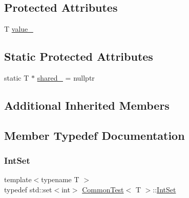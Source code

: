 \subsection*{Protected Attributes}
\begin{DoxyCompactItemize}
\item 
T \mbox{\hyperlink{class_common_test_ae59c4abcb833625a7baeb2048531ebec}{value\+\_\+}}
\end{DoxyCompactItemize}
\subsection*{Static Protected Attributes}
\begin{DoxyCompactItemize}
\item 
static T $\ast$ \mbox{\hyperlink{class_common_test_a52368ce1e65a865db9bdccbcc2cedaac}{shared\+\_\+}} = nullptr
\end{DoxyCompactItemize}
\subsection*{Additional Inherited Members}


\subsection{Member Typedef Documentation}
\mbox{\label{class_common_test_a62827e9d3064cddf4a8698747f1bd434}} 
\subsubsection{\texorpdfstring{IntSet}{IntSet}\hspace{0.1cm}{\footnotesize\ttfamily [1/3]}}
{\footnotesize\ttfamily template$<$typename T $>$ \\
typedef std\+::set$<$int$>$ \mbox{\hyperlink{class_common_test}{Common\+Test}}$<$ T $>$\+::\mbox{\hyperlink{class_common_test_a62827e9d3064cddf4a8698747f1bd434}{Int\+Set}}\hspace{0.3cm}{\ttfamily [protected]}}

\mbox{\label{class_common_test_a62827e9d3064cddf4a8698747f1bd434}} 
